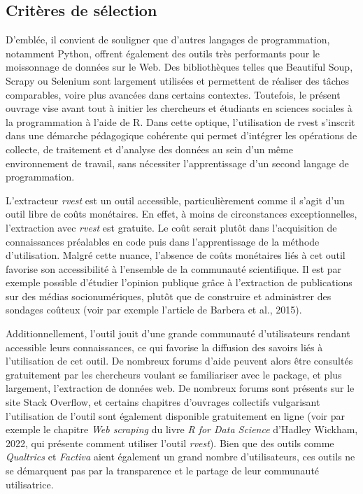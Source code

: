 \documentclass[
  letterpaper,
  DIV=11,
  numbers=noendperiod,
  oneside]{scrreprt}
\begin{document}
\hypertarget{crituxe8res-de-suxe9lection}{%
\subsection{Critères de sélection}\label{crituxe8res-de-suxe9lection}}

D'emblée, il convient de souligner que d'autres langages de
programmation, notamment Python, offrent également des outils très
performants pour le moissonnage de données sur le Web. Des bibliothèques
telles que Beautiful Soup, Scrapy ou Selenium sont largement utilisées
et permettent de réaliser des tâches comparables, voire plus avancées
dans certains contextes. Toutefois, le présent ouvrage vise avant tout à
initier les chercheurs et étudiants en sciences sociales à la
programmation à l'aide de R. Dans cette optique, l'utilisation de rvest
s'inscrit dans une démarche pédagogique cohérente qui permet d'intégrer
les opérations de collecte, de traitement et d'analyse des données au
sein d'un même environnement de travail, sans nécessiter l'apprentissage
d'un second langage de programmation.

L'extracteur \emph{rvest} est un outil accessible, particulièrement
comme il s'agit d'un outil libre de coûts monétaires. En effet, à moins
de circonstances exceptionnelles, l'extraction avec \emph{rvest} est
gratuite. Le coût serait plutôt dans l'acquisition de connaissances
préalables en code puis dans l'apprentissage de la méthode
d'utilisation. Malgré cette nuance, l'absence de coûts monétaires liés à
cet outil favorise son accessibilité à l'ensemble de la communauté
scientifique. Il est par exemple possible d'étudier l'opinion publique
grâce à l'extraction de publications sur des médias socionumériques,
plutôt que de construire et administrer des sondages coûteux (voir par
exemple l'article de Barbera et al., 2015).

Additionnellement, l'outil jouit d'une grande communauté d'utilisateurs
rendant accessible leurs connaissances, ce qui favorise la diffusion des
savoirs liés à l'utilisation de cet outil. De nombreux forums d'aide
peuvent alors être consultés gratuitement par les chercheurs voulant se
familiariser avec le package, et plus largement, l'extraction de données
web. De nombreux forums sont présents sur le site Stack Overflow, et
certains chapitres d'ouvrages collectifs vulgarisant l'utilisation de
l'outil sont également disponible gratuitement en ligne (voir par
exemple le chapitre \emph{Web scraping} du livre \emph{R for Data
Science} d'Hadley Wickham, 2022, qui présente comment utiliser l'outil
\emph{rvest}). Bien que des outils comme \emph{Qualtrics} et
\emph{Factiva} aient également un grand nombre d'utilisateurs, ces
outils ne se démarquent pas par la transparence et le partage de leur
communauté utilisatrice.
\end{document}
